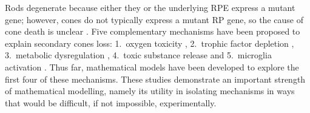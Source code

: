 \documentclass{article}
\begin{document}
Rods degenerate because either they or the underlying RPE express a mutant gene; however, cones do not typically express a mutant RP gene, so the cause of cone death is unclear \citep{Daiger_et_al_2007,Ferrari_et_al_2011,Hamel_2006,Hamel_2007,Hartong_et_al_2006,Roosing_et_al_2014}. Five complementary mechanisms have been proposed to explain secondary cones loss: 1.\ oxygen toxicity \citep{Stone_et_al_1999,Travis_et_al_1991,Valter_et_al_1998}, 2.\ trophic factor depletion \citep{Chalmel_et_al_2007,Leveillard_et_al_2004,Ait-Ali_et_al_2015}, 3.\ metabolic dysregulation \citep{Punzo_et_al_2009,Punzo_et_al_2012}, 4.\ toxic substance release \citep{Ripps_2002} and 5.\ microglia activation \citep{Gupta_et_al_2003}. Thus far, mathematical models have been developed to explore the first four of these mechanisms. These studies demonstrate an important strength of mathematical modelling, namely its utility in isolating mechanisms in ways that would be difficult, if not impossible, experimentally.
\end{document}
